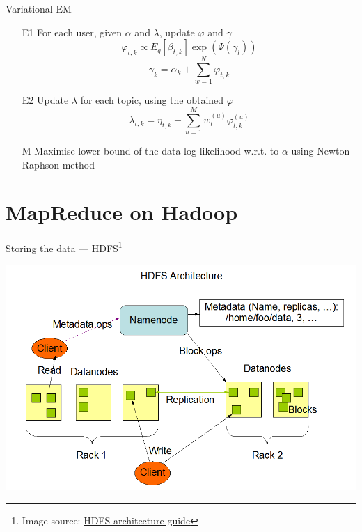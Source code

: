 \documentclass[aspectratio=1610]{beamer}
\begin{document}
\begin{frame}{Variational EM}

\begin{itemize}
\item[E1] For each user, given $\alpha$ and $\lambda$, update $\varphi$ and $\gamma$
\[
\varphi_{t,k} \propto E_q[\beta_{t,k}] \exp \left( \Psi(\gamma_l) \right)
\]
\[
\gamma_k = \alpha_k + \sum_{w=1}^N \varphi_{t,k}
\]
\item[E2] Update $\lambda$ for each topic, using the obtained $\varphi$ 
\[
\lambda_{t,k} =\eta_{t,k} + \sum_{u=1}^M w_{t}^{(u)} \varphi_{t,k}^{(u)}
\]
\item[M] Maximise lower bound of the data log likelihood w.r.t. to $\alpha$ using Newton-Raphson method
\end{itemize}

\section{MapReduce on Hadoop}

\end{frame}

\begin{frame}{Storing the data --- HDFS\footnote{Image source: \href{http://hadoop.apache.org/docs/r1.2.1/hdfs_design.html}{HDFS architecture guide}}}

\begin{center}
\includegraphics[scale=0.33]{images/hdfs.png}
\end{center}

\end{frame}
\end{document}
